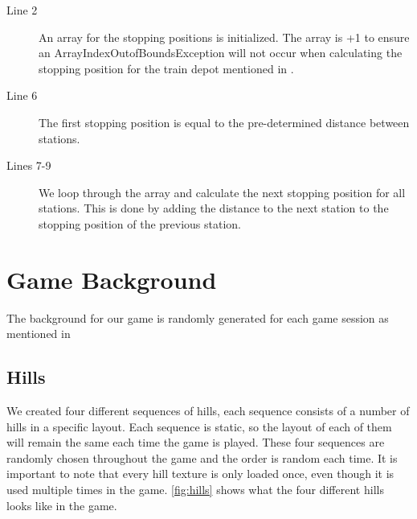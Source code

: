 \begin{description}
\item[Line 2] An array for the stopping positions is initialized. The array is +1 to ensure an ArrayIndexOutofBoundsException will not occur when calculating the stopping position for the train depot mentioned in .
\item[Line 6] The first stopping position is equal to the pre-determined distance between stations. 
\item[Lines 7-9] We loop through the array and calculate the next stopping position for all stations. This is done by adding the distance to the next station to the stopping position of the previous station.
\end{description}

\section{Game Background}

The background for our game is randomly generated for each game session as mentioned in 

\subsection{Hills}

We created four different sequences of hills, each sequence consists of a number of hills in a specific layout. Each sequence is static, so the layout of each of them will remain the same each time the game is played. These four sequences are randomly chosen throughout the game and the order is random each time. It is important to note that every hill texture is only loaded once, even though it is used multiple times in the game. \autoref{fig:hills} shows what the four different hills looks like in the game.

